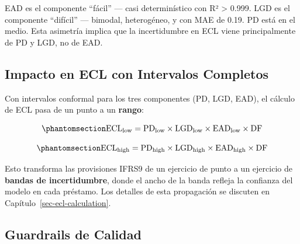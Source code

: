 \documentclass[
  spanish,
  11pt,
  letterpaper,
]{scrbook}
\theoremstyle{plain}
\theoremstyle{remark}
\begin{document}
\begin{tcolorbox}[enhanced jigsaw, arc=.35mm, bottomrule=.15mm, bottomtitle=1mm, breakable, colback=white, colbacktitle=quarto-callout-tip-color!10!white, colframe=quarto-callout-tip-color-frame, coltitle=black, left=2mm, leftrule=.75mm, opacityback=0, opacitybacktitle=0.6, rightrule=.15mm, title=\textcolor{quarto-callout-tip-color}{\faLightbulb}\hspace{0.5em}{EAD vs LGD: Niveles de Dificultad Opuestos}, titlerule=0mm, toprule=.15mm, toptitle=1mm]

EAD es el componente ``fácil'' --- casi determinístico con R²
\textgreater{} 0.999. LGD es el componente ``difícil'' --- bimodal,
heterogéneo, y con MAE de 0.19. PD está en el medio. Esta asimetría
implica que la incertidumbre en ECL viene principalmente de PD y LGD, no
de EAD.

\end{tcolorbox}

\subsection{Impacto en ECL con Intervalos
Completos}\label{impacto-en-ecl-con-intervalos-completos}

Con intervalos conformal para los tres componentes (PD, LGD, EAD), el
cálculo de ECL pasa de un punto a un \textbf{rango}:

\begin{equation}\protect\phantomsection\label{eq-ecl-low}{
\text{ECL}_\text{low} = \text{PD}_\text{low} \times \text{LGD}_\text{low} \times \text{EAD}_\text{low} \times \text{DF}
}\end{equation}

\begin{equation}\protect\phantomsection\label{eq-ecl-high}{
\text{ECL}_\text{high} = \text{PD}_\text{high} \times \text{LGD}_\text{high} \times \text{EAD}_\text{high} \times \text{DF}
}\end{equation}

Esto transforma las provisiones IFRS9 de un ejercicio de punto a un
ejercicio de \textbf{bandas de incertidumbre}, donde el ancho de la
banda refleja la confianza del modelo en cada préstamo. Los detalles de
esta propagación se discuten en Capítulo~\ref{sec-ecl-calculation}.

\subsection{Guardrails de Calidad}\label{guardrails-de-calidad}
\end{document}

